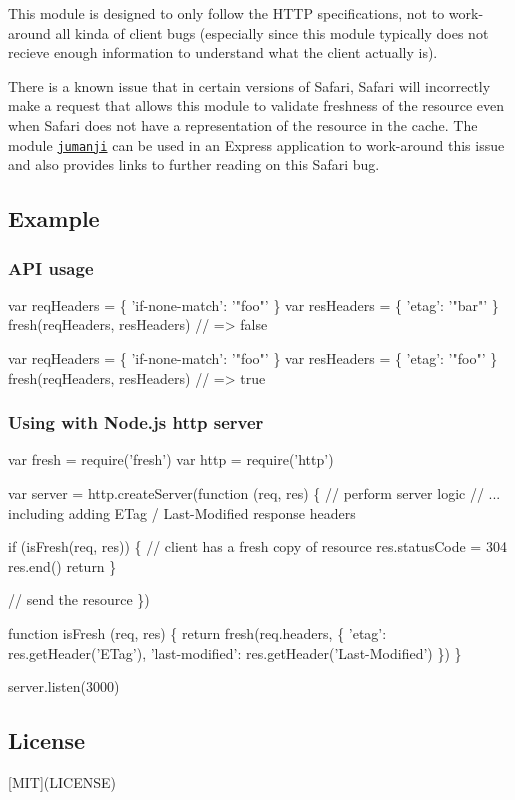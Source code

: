 This module is designed to only follow the H\+T\+TP specifications, not to work-\/around all kinda of client bugs (especially since this module typically does not recieve enough information to understand what the client actually is).

There is a known issue that in certain versions of Safari, Safari will incorrectly make a request that allows this module to validate freshness of the resource even when Safari does not have a representation of the resource in the cache. The module \href{https://www.npmjs.com/package/jumanji}{\tt jumanji} can be used in an Express application to work-\/around this issue and also provides links to further reading on this Safari bug.

\subsection*{Example}

\subsubsection*{A\+PI usage}


\begin{DoxyCode}
var reqHeaders = \{ 'if-none-match': '"foo"' \}
var resHeaders = \{ 'etag': '"bar"' \}
fresh(reqHeaders, resHeaders)
// => false

var reqHeaders = \{ 'if-none-match': '"foo"' \}
var resHeaders = \{ 'etag': '"foo"' \}
fresh(reqHeaders, resHeaders)
// => true
\end{DoxyCode}


\subsubsection*{Using with Node.\+js http server}


\begin{DoxyCode}
var fresh = require('fresh')
var http = require('http')

var server = http.createServer(function (req, res) \{
  // perform server logic
  // ... including adding ETag / Last-Modified response headers

  if (isFresh(req, res)) \{
    // client has a fresh copy of resource
    res.statusCode = 304
    res.end()
    return
  \}

  // send the resource
\})

function isFresh (req, res) \{
  return fresh(req.headers, \{
    'etag': res.getHeader('ETag'),
    'last-modified': res.getHeader('Last-Modified')
  \})
\}

server.listen(3000)
\end{DoxyCode}


\subsection*{License}

\mbox{[}M\+IT\mbox{]}(L\+I\+C\+E\+N\+SE) 